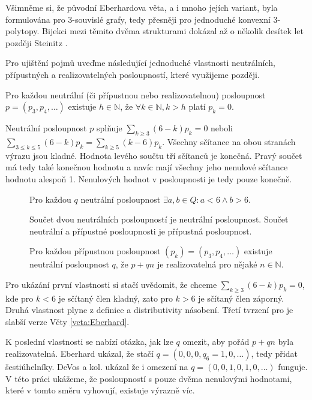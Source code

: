 Všimněme si, že původní Eberhardova věta, a i mnoho jejích variant, byla formulována pro 3-souvislé grafy, tedy přesněji pro jednoduché konvexní 3-polytopy. Bijekci mezi těmito dvěma strukturami dokázal až o několik desítek let později Steinitz \cite{Steinitz}. 

Pro ujištění pojmů uveďme následující jednoduché vlastnosti neutrálních, přípustných a realizovatelných posloupností, které využijeme později.
\begin{tvrz}
Pro každou neutrální (či přípustnou nebo realizovatelnou) posloupnost $p=(p_3,p_4,\dots)$ existuje $h \in \mathbb{N}$, že $ \forall k \in \mathbb{N}, k>h $ platí $ p_k=0$.
\end{tvrz}

\begin{dukaz}
Neutrální posloupnost $p$ splňuje $\sum_{k \geq 3}{(6-k)p_k}=0$ neboli $\sum_{3 \leq k \leq 5}{(6-k)p_k}=\sum_{k \geq 5}{(k-6)p_k}$. Všechny sčítance na obou stranách výrazu jsou kladné. Hodnota levého součtu tří sčítanců je konečná. Pravý součet má tedy také konečnou hodnotu a navíc mají všechny jeho nenulové sčítance hodnotu alespoň 1. Nenulových hodnot v posloupnosti je tedy pouze konečně. 
\end{dukaz}

\begin{tvrz}\label{veta:posloupnosti}
\begin{description}
\item[] Pro každou $q$ neutrální posloupnost $\exists a,b \in Q : a <6 \wedge b>6$.
\item[] Součet dvou neutrálních posloupností je neutrální posloupnost. Součet neutrální a přípustné posloupnosti je přípustná posloupnost.
\item[] Pro každou přípustnou posloupnost $(p_k) = (p_3,p_4,\dots)$ existuje neutrální posloupnost $q$, že $p+qn$ je realizovatelná pro nějaké $n \in \mathbb{N}$.
\end{description}
\end{tvrz}

Pro ukázání první vlastnosti si stačí uvědomit, že chceme $\sum_{k \geq 3}{(6-k)p_k} = 0$, kde pro $k < 6$ je sčítaný člen kladný, zato pro $k>6$ je sčítaný člen záporný. Druhá vlastnost plyne z definice a distributivity násobení. Třetí tvrzení pro je slabší verze Věty \ref{veta:Eberhard}.

K poslední vlastnosti se nabízí otázka, jak lze $q$ omezit, aby pořád $p+qn$ byla realizovatelná. Eberhard ukázal, že stačí  $q = (0,0,0,q_6=1,0,\dots)$, tedy přidat šestiúhelníky. DeVos a kol. ukázal že i omezení na  $q = (0,0,1,0,1,0,\dots)$ funguje. V této práci ukážeme, že posloupností s pouze dvěma nenulovými hodnotami, které v tomto směru vyhovují, existuje výrazně víc.



